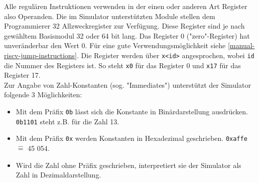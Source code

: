Alle regulären Instruktionen verwenden in der einen oder anderen Art Register
also Operanden. Die im Simulator unterstützten Module stellen dem Programmierer
32 Allzweckregister zur Verfügung. Diese Register sind je nach gewähltem
Basismodul 32 oder 64 bit lang. Das Register 0 ("zero"-Register) hat
unveränderbar den Wert 0. Für eine gute Verwendungsmöglichkeit siehe
\autoref{manual-riscv-jump-instructions}. Die Register werden über
\texttt{x<id>} angesprochen, wobei \texttt{id} die Nummer des Registers ist. So
steht \texttt{x0} für das Register 0 und \texttt{x17} für das Register 17.\\
Zur Angabe von Zahl-Konstanten (sog. "Immediates") unterstützt der Simulator
folgende 3 Möglichkeiten:
\begin{itemize}
	\item Mit dem Präfix \texttt{0b} lässt sich die Konstante in Binärdarstellung
	ausdrücken. \texttt{0b1101} steht z.B. für die Zahl 13.
	\item Mit dem Präfix \texttt{0x} werden Konstanten in Hexadezimal geschrieben.
	\texttt{0xaffe} $\widehat{=}$ 45 054.

	\item Wird die Zahl ohne Präfix geschrieben, interpretiert sie der Simulator als Zahl
	in Dezimaldarstellung.
\end{itemize}


